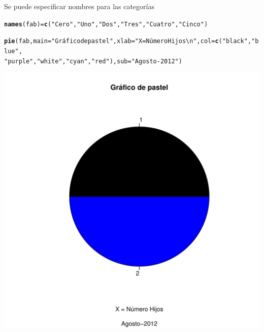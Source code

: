 \documentclass[10pt,a4paper]{article}\usepackage[]{graphicx}\usepackage[]{color}
\makeatletter
\def\maxwidth{ %
  \ifdim\Gin@nat@width>\linewidth
    \linewidth
  \else
    \Gin@nat@width
  \fi
}
\newcommand{\hlstr}[1]{\textcolor[rgb]{0.192,0.494,0.8}{#1}}%
\newcommand{\hlstd}[1]{\textcolor[rgb]{0.345,0.345,0.345}{#1}}%
\newcommand{\hlkwb}[1]{\textcolor[rgb]{0.69,0.353,0.396}{#1}}%
\newcommand{\hlkwc}[1]{\textcolor[rgb]{0.333,0.667,0.333}{#1}}%
\newcommand{\hlkwd}[1]{\textcolor[rgb]{0.737,0.353,0.396}{\textbf{#1}}}%
\newenvironment{kframe}{%
 \def\at@end@of@kframe{}%
 \ifinner\ifhmode%
  \def\at@end@of@kframe{\end{minipage}}%
  \begin{minipage}{\columnwidth}%
 \fi\fi%
 \def\FrameCommand##1{\hskip\@totalleftmargin \hskip-\fboxsep
 \colorbox{shadecolor}{##1}\hskip-\fboxsep
     \hskip-\linewidth \hskip-\@totalleftmargin \hskip\columnwidth}%
 \MakeFramed {\advance\hsize-\width
   \@totalleftmargin\z@ \linewidth\hsize
   \@setminipage}}%
 {\par\unskip\endMakeFramed%
 \at@end@of@kframe}
\newenvironment{knitrout}{}{} %
\makeatother
\begin{document}
  
  Se puede especificar nombres para las categorías
\begin{knitrout}
\color{fgcolor}\begin{kframe}
\begin{alltt}
  \hlkwd{names}\hlstd{(fab)} \hlkwb{=} \hlkwd{c}\hlstd{(}\hlstr{"Cero"}\hlstd{,} \hlstr{"Uno"}\hlstd{,} \hlstr{"Dos"}\hlstd{,} \hlstr{"Tres"}\hlstd{,} \hlstr{"Cuatro"}\hlstd{,} \hlstr{"Cinco"}\hlstd{)}
\end{alltt}


{\ttfamily\noindent\bfseries{}}\begin{alltt}
\hlkwd{pie}\hlstd{(fab,} \hlkwc{main}\hlstd{=}\hlstr{"Gráfico de pastel"}\hlstd{,} \hlkwc{xlab}\hlstd{=}\hlstr{"X = Número Hijos\textbackslash{}n"}\hlstd{,} \hlkwc{col}\hlstd{=}\hlkwd{c}\hlstd{(}\hlstr{"black"}\hlstd{,} \hlstr{"blue"}\hlstd{,}
                                                                    \hlstr{"purple"}\hlstd{,} \hlstr{"white"}\hlstd{,} \hlstr{"cyan"}\hlstd{,} \hlstr{"red"}\hlstd{),} \hlkwc{sub}\hlstd{=}\hlstr{"Agosto-2012"}\hlstd{)}
\end{alltt}
\end{kframe}
\includegraphics[width=\maxwidth]{figure/unnamed-chunk-16-1} 

\end{knitrout}
 
\end{document}
